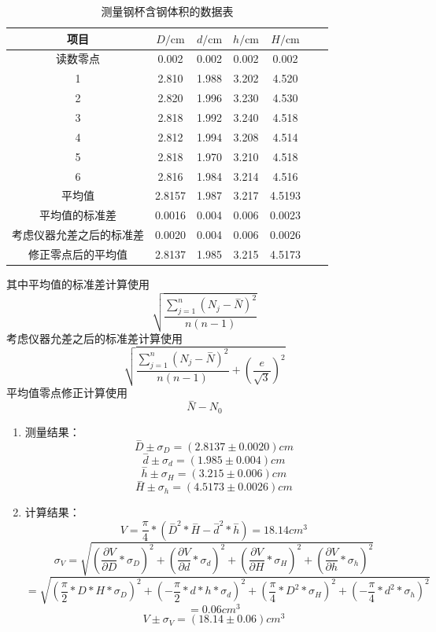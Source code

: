 \documentclass[a4paper,11pt]{article}
\begin{document}
	\begin{table}[H]
	\centering\caption{测量钢杯含钢体积的数据表}
	\small
	\begin{tabularx}{.85\linewidth}{C{1} *6{C{.8}}}
	\toprule
		\textbf{项目} &
		$D / \si{\cm}$ &
		$d / \si{\cm}$ &
		$h / \si{\cm}$ &
		$H / \si{\cm}$ & \\
	\midrule
	    读数零点     & 0.002  & 0.002  & 0.002 & 0.002 &   \\
		1     & 2.810  & 1.988  & 3.202 & 4.520    &  \\
		2     & 2.820  & 1.996  & 3.230 & 4.530    &   \\
		3     & 2.818  & 1.992  & 3.240 & 4.518    &  \\
		4     & 2.812  & 1.994  & 3.208 & 4.514    &  \\
		5     & 2.818  & 1.970  & 3.210 & 4.518    &  \\
		6     & 2.816  & 1.984  & 3.214 & 4.516    &  \\
		平均值    & 2.8157  & 1.987  & 3.217 & 4.5193 & \\
		平均值的标准差     & 0.0016  & 0.004  & 0.006 & 0.0023 &\\
		考虑仪器允差之后的标准差     & 0.0020  & 0.004  & 0.006 & 0.0026  &\\
		修正零点后的平均值     & 2.8137  & 1.985  & 3.215 & 4.5173 &\\
		
	\bottomrule
	\end{tabularx}
	\vspace{3ex}
	\end{table}\noindent%
    其中平均值的标准差计算使用$$ \sqrt{\frac{\sum _{j=1}^{n}{\left({N}_{j}-\stackrel{-}{N}\right)}^{2}}{n\left(n-1\right)}} $$
	考虑仪器允差之后的标准差计算使用$$\sqrt{\frac{\sum _{j=1}^{n}{\left({N}_{j}-\stackrel{-}{N}\right)}^{2}}{n\left(n-1\right)}+{\left(\frac{e}{\sqrt{3}}\right)}^{2}}$$
    平均值零点修正计算使用$$\stackrel{-}{N}-{N}_{0}$$
    \begin{enumerate}
    	\item 测量结果： 
    	$$\stackrel{-}{D} ± \sigma_{D} = (2.8137 ± 0.0020) cm$$
    	$$\stackrel{-}{d} ± \sigma_{d} = (1.985 ± 0.004) cm$$
    	$$\stackrel{-}{h} ± \sigma_{H} = (3.215 ± 0.006) cm$$
    	$$\stackrel{-}{H} ± \sigma_{h} = (4.5173 ± 0.0026) cm$$
    	\item 计算结果：
    	$$V = \dfrac{\pi}{4} * ( \stackrel{-}{D}^{2} * \stackrel{-}{H} - \stackrel{-}{d}^{2} * \stackrel{-}{h} ) =  18.14  cm^{3}$$
    	$$ \sigma_{V} = \sqrt{(\dfrac{\partial V}{\partial D} * \sigma_{D})^{2} + (\dfrac{\partial V}{\partial d} * \sigma_{d})^{2} + (\dfrac{\partial V}{\partial H} * \sigma_{H})^{2} + (\dfrac{\partial V}{\partial h} * \sigma_{h})^{2} } $$
    	$$ = \sqrt{(\dfrac{\pi}{2} * D * H *\sigma_{D} )^{2} + (- \dfrac{\pi}{2} * d * h *\sigma_{d} )^{2} + (\dfrac{\pi}{4} * D^{2}*\sigma_{H} )^{2} + (- \dfrac{\pi}{4} *  d^{2} *\sigma_{h} )^{2}} $$
    	$$ = 0.06 cm^{3}$$
    	$$ V ± \sigma_{V} = ( 18.14 ± 0.06 ) cm^{3} $$
    \end{enumerate}
	
\end{document}
